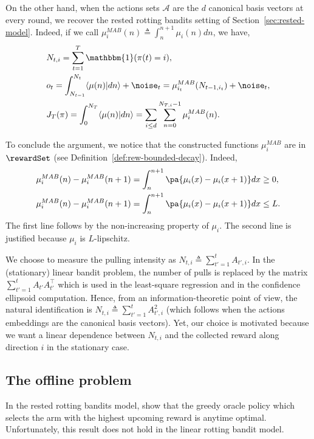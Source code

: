 On the other hand, when the actions sets $\mathcal{A}$ are the $d$ canonical basis vectors at every round, we recover the rested rotting bandits setting of Section~\ref{sec:rested-model}. Indeed, if we call $\mu_i^{MAB}(n) \triangleq \int_{n}^{n+1} \mu_i(n) dn$, we have,
\begin{align*}
&N_{t,i} = \sum_{t=1}^T \mathbbm{1}(\pi(t) = i),\\
&o_t =  \int_{N_{t-1}}^{N_{t}} \langle \mu(n) |   dn \rangle  + \noise_t = \mu_{i_t}^{MAB}(N_{t-1, i_t}) + \noise_t,\\
& J_T(\pi) = \int_{0}^{N_{T}} \langle \mu(n) |  dn \rangle = \sum_{i\leq d} \sum_{n=0}^{N_{T, i}-1} \mu_{i}^{MAB}(n).
\end{align*}

To conclude the argument, we notice that the constructed functions $\mu_i^{MAB}$ are in $\rewardSet$ (see Definition~\ref{def:rew-bounded-decay}). Indeed, 
\begin{align*}
&\mu_i^{MAB}(n) -\mu_i^{MAB}(n+1) = \int_{n}^{n+1} \pa{\mu_i(x) - \mu_i(x+1)} dx \geq 0,\\
&\mu_i^{MAB}(n) -\mu_i^{MAB}(n+1) = \int_{n}^{n+1} \pa{\mu_i(x) - \mu_i(x+1)} dx \leq L.
\end{align*}
The first line follows by the non-increasing property of $\mu_i$. The second line is justified because $\mu_i$ is $L$-lipschitz.
 
\begin{remark}
We choose to measure the pulling intensity as $N_{t,i} \triangleq \sum_{t'=1}^t A_{t',i}$. In the (stationary) linear bandit problem, the number of pulls is replaced by the matrix $\sum_{t'=1}^t A_{t'}A_{t'}^\intercal$ which is used in the least-square regression and in the confidence ellipsoid computation. Hence, from an information-theoretic point of view, the natural identification is $N_{t,i} \triangleq \sum_{t'=1}^t A_{t',i}^2 $  (which follows when the actions embeddings are the canonical basis vectors). Yet, our choice is motivated because we want a linear dependence between  $N_{t,i}$ and the collected reward along direction $i$ in the stationary case.
\end{remark} 

\subsection{The offline problem}
\label{ss:linear-rotting-offline}
In the rested rotting bandits model, \citet{heidari2016tight} show that the greedy oracle policy which selects the arm with the highest upcoming reward is anytime optimal. Unfortunately, this result does not hold in the linear rotting bandit model. 

